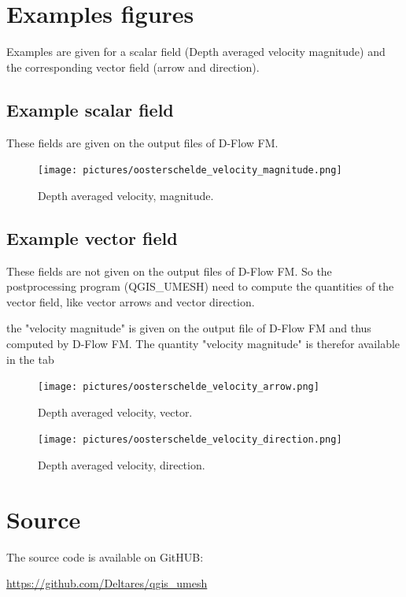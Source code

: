 \documentclass{deltares_memo}
\newcommand{\dflowfm}{D-Flow FM\xspace}
\newcommand{\qumesh}{QGIS\_UMESH\xspace}
\begin{document}
\section{Examples figures}
Examples are given for a scalar field (Depth averaged velocity magnitude) and the corresponding vector field (arrow and direction).
\subsection{Example scalar field}
These fields are given on the output files of \dflowfm.
\begin{figure}[H]
	\centering    
	\texttt{[image: pictures/oosterschelde\_velocity\_magnitude.png]}
	\caption{Depth averaged velocity, magnitude.\label{fig:velocity_magnitude}}
\end{figure}
\subsection{Example vector field}
These fields are not given on the output files of \dflowfm.
So the postprocessing program (\qumesh) need to compute the quantities of the vector field, like vector arrows and vector direction. 

\Note the "velocity magnitude" is given on the output file of \dflowfm and thus computed by \dflowfm.
The quantity "velocity magnitude" is therefor available in the tab 
\begin{figure}[H]
	\centering    
	\texttt{[image: pictures/oosterschelde\_velocity\_arrow.png]}
	\caption{Depth averaged velocity, vector.\label{fig:velocity_vector}}
\end{figure}

\begin{figure}[H]
	\centering    
	\texttt{[image: pictures/oosterschelde\_velocity\_direction.png]}
	\caption{Depth averaged velocity, direction.\label{fig:velocity_vector_direction}}
\end{figure}
\section{Source}
The source code is available on GitHUB:

\url{https://github.com/Deltares/qgis_umesh}
\end{document}
